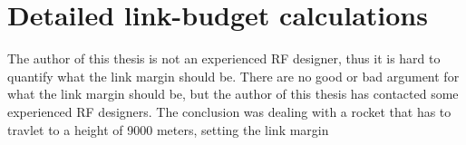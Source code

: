 \chapter{Detailed link-budget calculations}

The author of this thesis is not an experienced RF designer, thus it is hard to quantify what the link margin should be. There are no good or bad argument for what the link margin should be, but the author of this thesis has contacted some experienced RF designers. The conclusion was dealing with a rocket that has to travlet to a height of 9000 meters, setting the link margin    
